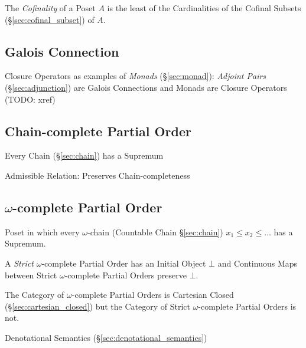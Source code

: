 The \emph{Cofinality} of a Poset $A$ is the least of the Cardinalities
of the Cofinal Subsets (\S\ref{sec:cofinal_subset}) of $A$.



\subsection{Galois Connection}\label{sec:galois_connection}

Closure Operators as examples of \emph{Monads} (\S\ref{sec:monad}):
\emph{Adjoint Pairs} (\S\ref{sec:adjunction}) are Galois Connections and Monads
are Closure Operators (TODO: xref)



\subsection{Chain-complete Partial Order}\label{sec:cpo}

Every Chain (\S\ref{sec:chain}) has a Supremum

Admissible Relation: Preserves Chain-completeness



\subsection{$\omega$-complete Partial Order}\label{sec:omega_cpo}

Poset in which every $\omega$-chain (Countable Chain
\S\ref{sec:chain}) $x_1 \leq x_2 \leq \ldots$ has a Supremum.

A \emph{Strict} $\omega$-complete Partial Order has an Initial Object
$\bot$ and Continuous Maps between Strict $\omega$-complete Partial
Orders preserve $\bot$.

The Category of $\omega$-complete Partial Orders is Cartesian Closed
(\S\ref{sec:cartesian_closed}) but the Category of Strict
$\omega$-complete Partial Orders is not.

Denotational Semantics (\S\ref{sec:denotational_semantics})

